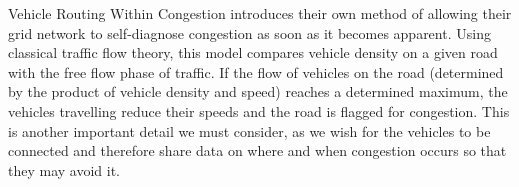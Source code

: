 \documentclass[letterpaper,10pt,draftclsnofoot,onecolumn]{IEEEtran} %
\begin{document}
\begin{section}{Vehicle Routing Within Congestion}
introduces their own method of allowing their grid network to self-diagnose congestion as soon as it becomes apparent.
Using classical traffic flow theory, this model compares vehicle density on a given road with the free flow phase of
traffic. If the flow of vehicles on the road (determined by the product of vehicle density and speed) reaches a
determined maximum, the vehicles travelling reduce their speeds and the road is flagged for congestion. This is another
important detail we must consider, as we wish for the vehicles to be connected and therefore share data on where and
when congestion occurs so that they may avoid it.
\end{section}	



\end{document}
